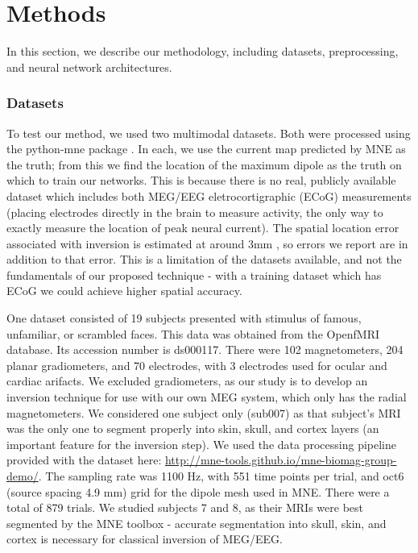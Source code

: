 \documentclass[journal,12pt,onecolumn,draftclsnofoot,]{IEEEtran}
\begin{document}
\section{Methods}

In this section, we describe our methodology, including datasets, preprocessing, and neural network architectures.

\subsubsection{Datasets}

To test our method, we used two multimodal datasets. Both were processed using the python-mne package \cite{gramfort2014mne}. In each, we use the current map predicted by MNE as the truth; from this we find the location of the maximum dipole as the truth on which to train our networks. This is because there is no real, publicly available dataset which includes both MEG/EEG eletrocortigraphic (ECoG) measurements (placing electrodes directly in the brain to measure activity, the only way to exactly measure the location of peak neural current). The spatial location error associated with inversion is estimated at around 3mm \cite{leahy1998study}, so errors we report are in addition to that error. This is a limitation of the datasets available, and not the fundamentals of our proposed technique - with a training dataset which has ECoG we could achieve higher spatial accuracy.

One dataset \cite{wakeman2015multi} consisted of 19 subjects presented with stimulus of famous, unfamiliar, or scrambled faces. This data was obtained from the OpenfMRI database. Its accession number is ds000117. There were 102 magnetometers, 204 planar gradiometers, and 70 electrodes, with 3 electrodes used for ocular and cardiac arifacts. We excluded gradiometers, as our study is to develop an inversion technique for use with our own MEG system, which only has the radial magnetometers. We considered one subject only (sub007) as that subject's MRI was the only one to segment properly into skin, skull, and cortex layers (an important feature for the inversion step). We used the data processing pipeline provided with the dataset here: \url{http://mne-tools.github.io/mne-biomag-group-demo/}. The sampling rate was 1100 Hz, with 551 time points per trial, and oct6 (source spacing 4.9 mm) grid for the dipole mesh used in MNE. There were a total of 879 trials. We studied subjects 7 and 8, as their MRIs were best segmented by the MNE toolbox - accurate segmentation into skull, skin, and cortex is necessary for classical inversion of MEG/EEG.
\end{document}
